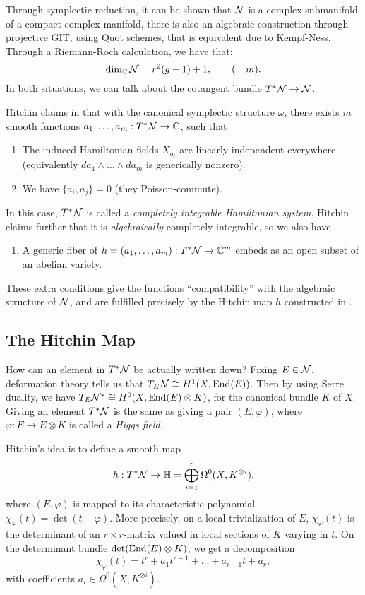 Through symplectic reduction, it can be shown that $\mathcal{N}$ is a complex submanifold of a compact complex manifold, there is also an algebraic construction through projective GIT, using Quot schemes, that is equivalent due to Kempf-Ness. Through a Riemann-Roch calculation, we have that:
\begin{equation}
    \dim_{\mathbb{C}}{\mathcal{N}}=r^2(g-1)+1,\qquad(=m).
\end{equation}
In both situations, we can talk about the cotangent bundle $T^*\mathcal{N}\rightarrow\mathcal{N}$.

Hitchin claims in \cite{hitch} that with the canonical symplectic structure $\omega$, there exists $m$ smooth functions $a_1,\ldots,a_m:T^*\mathcal{N}\rightarrow\mathbb{C}$, such that
\begin{enumerate}[label=(\alph*)]
    \item The induced Hamiltonian fields $X_{a_i}$ are linearly independent everywhere (equivalently $da_1\wedge\ldots\wedge da_m$ is generically nonzero).
    \item We have $\{a_i,a_j\}=0$ (they Poisson-commute).
\end{enumerate}
In this case, $T^*\mathcal{N}$ is called a \textit{completely integrable Hamiltonian system}. Hitchin claims further that it is \textit{algebraically} completely integrable, so we also have
\begin{enumerate}[label=(\alph*),resume]
    \item A generic fiber of $h=(a_1,\ldots,a_m):T^*\mathcal{N}\rightarrow\mathbb{C}^m$ embeds as an open subset of an abelian variety.
\end{enumerate}

These extra conditions give the functions ``compatibility'' with the algebraic structure of $\mathcal{N}$, and are fulfilled precisely by the Hitchin map $h$ constructed in \cite{hitch}.

\subsection{The Hitchin Map}

How can an element in $T^*\mathcal{N}$ be actually written down? Fixing $E\in\mathcal{N}$, deformation theory tells us that $T_E\mathcal{N}\cong H^1(X,\text{End}(E))$. Then by using Serre duality, we have $T_E\mathcal{N}^*\cong H^0(X,\text{End}(E)\otimes K)$, for the canonical bundle $K$ of $X$. Giving an element $T^*\mathcal{N}$ is the same as giving a pair $(E,\varphi)$, where $\varphi:E\rightarrow E\otimes K$ is called a \textit{Higgs field}.

Hitchin's idea is to define a smooth map
\begin{equation}
    h:T^*\mathcal{N}\rightarrow\mathbb{H}=\bigoplus_{i=1}^r\Omega^0(X,K^{\otimes i}),
\end{equation}
where $(E,\varphi)$ is mapped to its characteristic polynomial $\chi_\varphi(t)=\det(t-\varphi)$. More precisely, on a local trivialization of $E$, $\chi_\varphi(t)$ is the determinant of an $r\times r$-matrix valued in local sections of $K$ varying in $t$. On the determinant bundle $\text{det}(\text{End}(E)\otimes K)$, we get a decomposition
\begin{equation}
    \chi_\varphi(t)=t^r+a_1t^{r-1}+\ldots+a_{r-1}t+a_r,
\end{equation}
with coefficients $a_i\in\Omega^0(X,K^{\otimes i})$.

